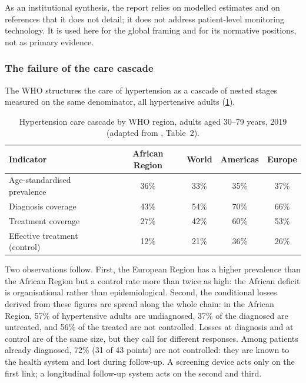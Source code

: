 As an institutional synthesis, the report relies on modelled estimates and on references that it does not detail; it does not address patient-level monitoring technology. It is used here for the global framing and for its normative positions, not as primary evidence.

\subsubsection{The failure of the care cascade}\label{sec:cascade}

The WHO structures the care of hypertension as a cascade of nested stages measured on the same denominator, all hypertensive adults (\cref{tab:cascade}).

\begin{table}[htbp]
\centering\small
\caption{Hypertension care cascade by WHO region, adults aged 30--79 years, 2019 (adapted from \cite{who2023hypertension}, Table~2).}\label{tab:cascade}
\begin{tabularx}{\textwidth}{@{}X c c c c@{}}
\toprule
\textbf{Indicator} & \textbf{African Region} & \textbf{World} & \textbf{Americas} & \textbf{Europe} \\
\midrule
Age-standardised prevalence & 36\% & 33\% & 35\% & 37\% \\
Diagnosis coverage & 43\% & 54\% & 70\% & 66\% \\
Treatment coverage & 27\% & 42\% & 60\% & 53\% \\
Effective treatment (control) & 12\% & 21\% & 36\% & 26\% \\
\bottomrule
\end{tabularx}
\end{table}

Two observations follow. First, the European Region has a higher prevalence than the African Region but a control rate more than twice as high: the African deficit is organisational rather than epidemiological. Second, the conditional losses derived from these figures are spread along the whole chain: in the African Region, 57\% of hypertensive adults are undiagnosed, 37\% of the diagnosed are untreated, and 56\% of the treated are not controlled. Losses at diagnosis and at control are of the same size, but they call for different responses. Among patients already diagnosed, 72\% (31 of 43 points) are not controlled: they are known to the health system and lost during follow-up. A screening device acts only on the first link; a longitudinal follow-up system acts on the second and third.

